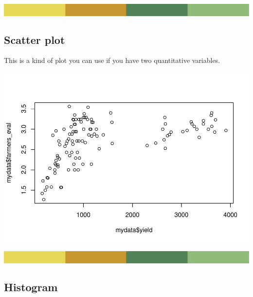 \documentclass[
]{book}
\newenvironment{Shaded}{\begin{snugshade}}{\end{snugshade}}
\newcommand{\AttributeTok}[1]{\textcolor[rgb]{0.77,0.63,0.00}{#1}}
\newcommand{\CommentTok}[1]{\textcolor[rgb]{0.56,0.35,0.01}{\textit{#1}}}
\newcommand{\FunctionTok}[1]{\textcolor[rgb]{0.00,0.00,0.00}{#1}}
\newcommand{\NormalTok}[1]{#1}
\newcommand{\SpecialCharTok}[1]{\textcolor[rgb]{0.00,0.00,0.00}{#1}}
\begin{document}
\includegraphics{rsrstrip.png}

\hypertarget{scatter-plot}{%
\subsection{Scatter plot}\label{scatter-plot}}

This is a kind of plot you can use if you have two quantitative variables.

\begin{Shaded}
\end{Shaded}

\includegraphics{PPB-Toolkit-for-R-and-R-Studio_files/figure-latex/unnamed-chunk-51-1.pdf}

\includegraphics{rsrstrip.png}

\hypertarget{histogram}{%
\subsection{Histogram}\label{histogram}}
\end{document}
